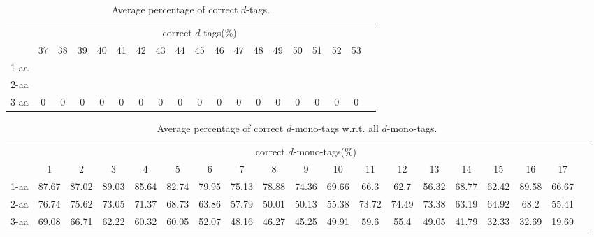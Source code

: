 \begin{table}[h]\tiny
\vspace{3mm}
{\centering
\begin{center}
\begin{tabular}{|l|c|c|c|c|c|c|c|c|c|c|c|c|c|c|c|c|c|c|}
  \hline
  & \multicolumn{ 17 }{|c|}{correct $d$-tags(\%)} \\
  \cline{2- 18}
    & 37 & 38 & 39 & 40 & 41 & 42 & 43 & 44 & 45 & 46 & 47 & 48 & 49 & 50 & 51 & 52 & 53\\
  \hline
1-aa  &  &  &  &  &  &  &  &  &  &  &  &  &  &  &  &  & \\
2-aa  &  &  &  &  &  &  &  &  &  &  &  &  &  &  &  &  & \\
3-aa  & 0 & 0 & 0 & 0 & 0 & 0 & 0 & 0 & 0 & 0 & 0 & 0 & 0 & 0 & 0 & 0 & 0\\
 \hline
\end{tabular}
\end{center}
\par}
\centering
\caption{ Average percentage of correct $d$-tags.}
\vspace{3mm}
\label{table:correct-d-tags}
\end{table}
\begin{table}[h]\tiny
\vspace{3mm}
{\centering
\begin{center}
\begin{tabular}{|l|c|c|c|c|c|c|c|c|c|c|c|c|c|c|c|c|c|c|}
  \hline
  & \multicolumn{ 17 }{|c|}{correct $d$-mono-tags(\%)} \\
  \cline{2- 18}
    & 1 & 2 & 3 & 4 & 5 & 6 & 7 & 8 & 9 & 10 & 11 & 12 & 13 & 14 & 15 & 16 & 17\\
  \hline
1-aa  & 87.67 & 87.02 & 89.03 & 85.64 & 82.74 & 79.95 & 75.13 & 78.88 & 74.36 & 69.66 & 66.3 & 62.7 & 56.32 & 68.77 & 62.42 & 89.58 & 66.67\\
2-aa  & 76.74 & 75.62 & 73.05 & 71.37 & 68.73 & 63.86 & 57.79 & 50.01 & 50.13 & 55.38 & 73.72 & 74.49 & 73.38 & 63.19 & 64.92 & 68.2 & 55.41\\
3-aa  & 69.08 & 66.71 & 62.22 & 60.32 & 60.05 & 52.07 & 48.16 & 46.27 & 45.25 & 49.91 & 59.6 & 55.4 & 49.05 & 41.79 & 32.33 & 32.69 & 19.69\\
 \hline
\end{tabular}
\end{center}
\par}
\centering
\caption{ Average percentage of correct $d$-mono-tags w.r.t. all $d$-mono-tags.}
\vspace{3mm}
\label{table:correct-d-mono-tags}
\end{table}
